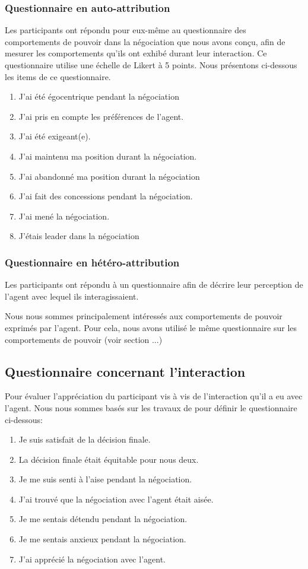 		\subsubsection{Questionnaire en auto-attribution} Les participants ont répondu pour eux-même au questionnaire des comportements de pouvoir dans la négociation que nous avons conçu, afin de mesurer les comportements qu'ils ont exhibé durant leur interaction. Ce questionnaire utilise une échelle de Likert à 5 points. Nous présentons ci-dessous les items de ce questionnaire. 
		\begin{enumerate}
				\item J'ai été égocentrique pendant la négociation
				\item J'ai pris en compte les préférences de l'agent.
				\item J'ai été exigeant(e).
				\item J'ai maintenu ma position durant la négociation.
				\item J'ai abandonné ma position durant la négociation
				\item J'ai fait des concessions pendant la négociation.	
				\item J'ai mené la négociation.
				\item J'étais leader dans la négociation
		\end{enumerate}
		 
		 \subsubsection{Questionnaire en hétéro-attribution}
		 Les participants ont répondu à un questionnaire afin de décrire leur perception de l’agent avec lequel ils interagissaient.
		 
		 Nous nous sommes principalement intéressés aux comportements de pouvoir exprimés par l'agent. Pour cela, nous avons utilisé le même questionnaire sur les comportements de pouvoir (voir section ...)
 
		 \subsection{Questionnaire concernant l'interaction}
		 Pour évaluer l'appréciation du participant vis à vis de l'interaction qu'il a eu avec l'agent. Nous nous sommes basés sur les travaux de \cite{tiedens2003power} pour définir le questionnaire ci-dessous:
		
		 \begin{enumerate}
		 	\item Je suis satisfait de la décision finale.
		 	\item La décision finale était équitable pour nous deux.
			\item Je me suis senti à l'aise pendant la négociation.
			\item J'ai trouvé que la négociation avec l'agent était aisée.
			\item Je me sentais détendu pendant la négociation.
			\item Je me sentais anxieux pendant la négociation.
			\item J'ai apprécié la négociation avec l'agent.
		 \end{enumerate}
		 
